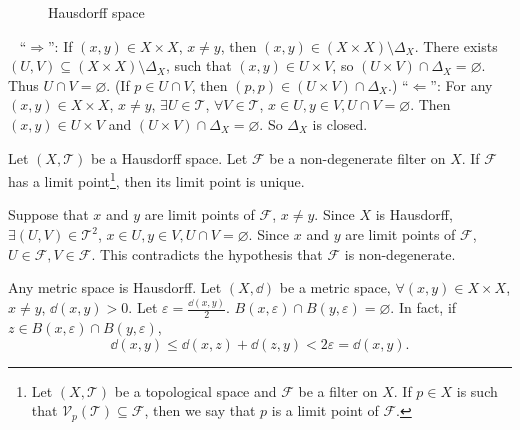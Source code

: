 \begin{propositionenv}
\begin{figure}[H]
\caption{Hausdorff space}
    \end{figure}
\end{propositionenv}
\begin{proofenv}
    \ \newline
    ``$\Rightarrow$'': If $(x,y)\in X\times X$, $x\neq y$, then $(x,y)\in (X\times X)\setminus \Delta_X$. There exists $ (U,V)\subseteq (X\times X)\setminus \Delta_X$, such that $(x,y)\in U\times V$, so $(U\times V)\cap \Delta_X=\varnothing$. Thus $U\cap V=\varnothing$. (If $p\in U\cap V$, then $(p,p)\in (U\times V)\cap \Delta_X$.)
    \newline
    ``$\Leftarrow$'': For any $(x,y)\in X\times X$, $x\neq y$, $\exists U\in \mathscr{T}$, $\forall V\in \mathscr{T}$, $x\in U, y\in V, U\cap V=\varnothing$. Then $(x,y)\in U\times V$ and $(U\times V)\cap \Delta_X=\varnothing$. So $\Delta_X$ is closed. 
\end{proofenv}
\begin{propositionenv}
    Let $(X,\mathscr{T})$ be a Hausdorff space. Let $\mathcal{F}$ be a non-degenerate filter on $X$. If $\mathcal{F}$ has a limit point\footnote{Let $(X,\mathscr{T})$ be a topological space and $\mathcal{F}$ be a filter on $X$. If $p\in X$ is such that $\mathcal{V}_p(\mathscr{T})\subseteq \mathcal{F}$, then we say that $p$ is a limit point of $\mathcal{F}$.}, then its limit point is unique.
\end{propositionenv}
\begin{proofenv}[By contradiction]
    Suppose that $x$ and $y$ are limit points of $\mathcal{F}$, $x\neq y$. Since $X$ is Hausdorff, $\exists (U,V)\in \mathscr{T}^2$, $x\in U,y\in V, U\cap V=\varnothing$. Since $x$ and $y$ are limit points of $\mathcal{F}$, $U\in\mathcal{F}, V\in \mathcal{F}$. This contradicts the hypothesis that $\mathcal{F}$ is non-degenerate.
\end{proofenv}
\begin{exampleenv}
    Any {\color{brown} metric space} is Hausdorff. 
    \newline
    Let $(X,\dd)$ be a metric space, $\forall (x,y)\in X\times X$, $x\neq y$, $\dd(x,y)>0$. Let $\varepsilon=\frac{\dd(x,y)}{2}$. $B(x,\varepsilon)\cap B(y,\varepsilon)=\varnothing.$ In fact, if $z\in B(x,\varepsilon)\cap B(y,\varepsilon)$,
    $$\dd(x,y)\le \dd(x,z)+\dd(z,y)<2\varepsilon=\dd(x,y).$$
\end{exampleenv}
